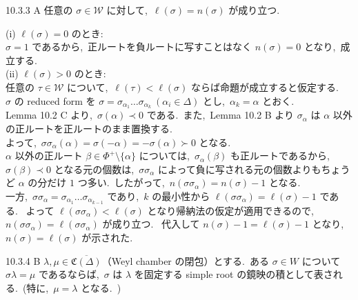 \documentclass[uplatex,dvipdfmx]{jsarticle}
\begin{document}
\begin{mylemma}{10.3.3 A}
    任意の $\sigma \in \mathcal{W}$ に対して,~$\ell(\sigma) = n(\sigma)$ が成り立つ.~
\end{mylemma}
\begin{myproof}
    (i) $\ell(\sigma) = 0$ のとき:\\
    $\sigma = 1$ であるから,~正ルートを負ルートに写すことはなく $n(\sigma) = 0$ となり,~成立する.\\
    (ii) $\ell(\sigma) > 0$ のとき:\\
    任意の $\tau \in \mathcal{W}$ について,~$\ell(\tau) < \ell(\sigma)$ ならば命題が成立すると仮定する.~\\
    $\sigma$ の reduced form を $\sigma = \sigma_{\alpha_1} \dots \sigma_{\alpha_k} \ (\alpha_i \in \Delta)$ とし,~$\alpha_k = \alpha$ とおく.~\\   
    Lemma 10.2 C より,~$\sigma(\alpha) \prec 0$ である.~また,~Lemma 10.2 B より $\sigma_\alpha$ は $\alpha$ 以外の正ルートを正ルートのまま置換する.~\\
    よって,~$\sigma \sigma_\alpha(\alpha) = \sigma(-\alpha) = -\sigma(\alpha) \succ 0$ となる.~\\
    $\alpha$ 以外の正ルート $\beta \in \Phi^+ \setminus \{\alpha\}$ については,~$\sigma_\alpha(\beta)$ も正ルートであるから,~$\sigma(\beta) \prec 0$ となる元の個数は,~$\sigma \sigma_\alpha$ によって負に写される元の個数よりもちょうど $\alpha$ の分だけ $1$ つ多い.~したがって,~$n(\sigma \sigma_\alpha) = n(\sigma) - 1$ となる.~\\
    一方,~$\sigma \sigma_\alpha = \sigma_{\alpha_1} \dots \sigma_{\alpha_{k-1}}$ であり,~$k$ の最小性から $\ell(\sigma \sigma_\alpha) = \ell(\sigma) - 1$ である.~
    よって $\ell(\sigma \sigma_\alpha) < \ell(\sigma)$ となり帰納法の仮定が適用できるので,~$n(\sigma \sigma_\alpha) = \ell(\sigma \sigma_\alpha)$ が成り立つ.~
    代入して $n(\sigma) - 1 = \ell(\sigma) - 1$ となり,~$n(\sigma) = \ell(\sigma)$ が示された.~
\end{myproof}
\begin{mylemma}{10.3.4 B}
    $\lambda, \mu \in \overline{\mathfrak{C}(\Delta)}$（Weyl chamber の閉包）とする.~ある $\sigma \in W$ について $\sigma \lambda = \mu$ であるならば,~$\sigma$ は $\lambda$ を固定する simple root の鏡映の積として表される.~(特に,~$\mu = \lambda$ となる.~)
\end{mylemma}
\end{document}
